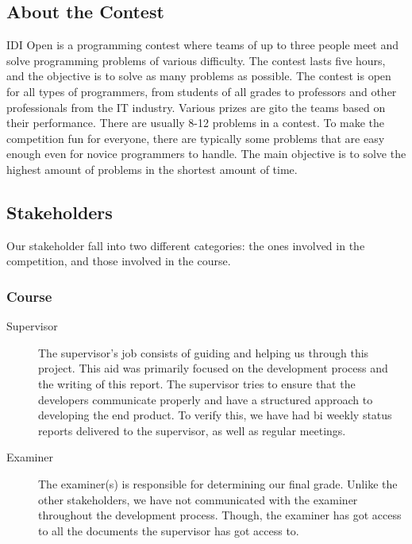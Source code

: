 \subsection{About the Contest}
IDI Open is a programming contest where teams of up to three people meet
and solve programming problems of various difficulty. The contest lasts
five hours, and the objective is to solve as many problems as possible.
The contest is open for all types of programmers, from students of all
grades to professors and other professionals from the IT industry.
Various prizes are gi\ven to the teams based on their performance. There
are usually 8-12 problems in a contest. To make the competition fun for
everyone, there are typically some problems that are easy enough even
for novice programmers to handle. The main objective is to solve the
highest amount of problems in the shortest amount of time.

\subsection{Stakeholders}
Our stakeholder fall into two different categories: the ones involved in
the competition, and those involved in the course.
\subsubsection{Course}

\begin{description}
\item[Supervisor]
The supervisor's job consists of guiding and helping us
through this project. This aid was primarily focused on the development
process and the writing of this report. The supervisor tries to ensure
that the developers communicate properly and have a structured approach
to developing the end product. To verify this, we have had bi weekly
status reports delivered to the supervisor, as well as regular
meetings.

\item[Examiner]
The examiner(s) is responsible for determining our final grade. Unlike
the other stakeholders, we have not communicated with the examiner
throughout the development process. Though, the examiner has got access
to all the documents the supervisor has got access to.
\end{description}

